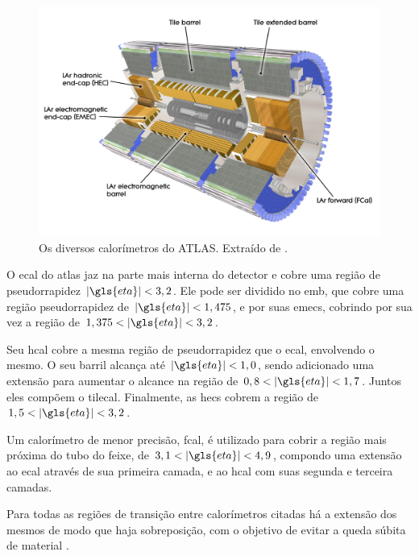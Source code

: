 \begin{figure}[h!t]
\centering
\includegraphics[width=\textwidth]{imagens/calorimetros.pdf}
\caption[Os diversos subsistemas de calorimetria do ATLAS]{
Os diversos calorímetros do ATLAS. Extraído de
\cite{atlas_calorimeter_photo}.}
\label{fig:cal_atlas}
\end{figure}

O \gls{ecal} do \gls{atlas} jaz na parte mais interna do detector e cobre uma região de 
pseudorrapidez $|\gls{eta}|<3,2$. Ele pode ser dividido no
\gls{emb}, que cobre uma região pseudorrapidez de $|\gls{eta}|<1,475$, 
e por suas \glspl{emec}, cobrindo por sua vez a região de $1,375<|\gls{eta}|<3,2$.

Seu \gls{hcal} cobre a mesma região de pseudorrapidez que o \gls{ecal}, envolvendo
o mesmo. O seu barril alcança até $|\gls{eta}|<1,0$, sendo adicionado uma
extensão para aumentar o alcance na região de $0,8<|\gls{eta}|<1,7$. Juntos eles
compõem o \gls{tilecal}. Finalmente, as \glspl{hec} cobrem a região de $1,5<|\gls{eta}|<3,2$. 

Um calorímetro de menor precisão, \gls{fcal}, 
é utilizado para cobrir a região mais próxima do tubo do feixe, de
$3,1<|\gls{eta}|<4,9$, compondo uma extensão ao \gls{ecal} através de sua primeira camada,  
e ao \gls{hcal} com suas segunda e terceira camadas. 

Para todas as regiões de transição entre calorímetros citadas 
há a extensão dos mesmos de modo que haja sobreposição, 
com o objetivo de evitar a queda súbita de material \cite{paper_atlas}. 

